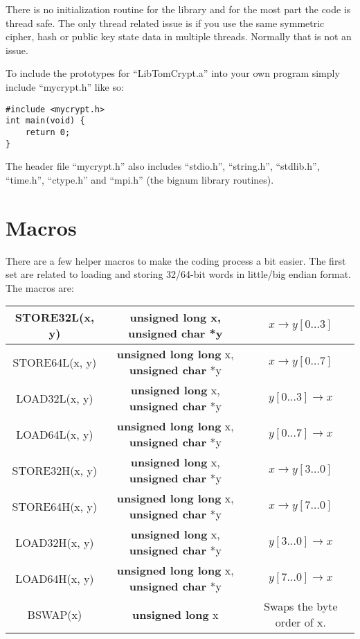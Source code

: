 \documentclass{book}
\begin{document}
There is no initialization routine for the library and for the most part the code is thread safe.  The only thread
related issue is if you use the same symmetric cipher, hash or public key state data in multiple threads.  Normally
that is not an issue.

To include the prototypes for ``LibTomCrypt.a'' into your own program simply include ``mycrypt.h'' like so:
\begin{verbatim}
#include <mycrypt.h>
int main(void) {
    return 0;
}
\end{verbatim}

The header file ``mycrypt.h'' also includes ``stdio.h'', ``string.h'', ``stdlib.h'', ``time.h'', ``ctype.h'' and ``mpi.h''
(the bignum library routines).

\section{Macros}

There are a few helper macros to make the coding process a bit easier.  The first set are related to loading and storing
32/64-bit words in little/big endian format.  The macros are:

   
    
\begin{small}
\begin{center}
\begin{tabular}{|c|c|c|}
     \hline STORE32L(x, y) & {\bf unsigned long} x, {\bf unsigned char} *y & $x \to y[0 \ldots 3]$ \\
     \hline STORE64L(x, y) & {\bf unsigned long long} x, {\bf unsigned char} *y & $x \to y[0 \ldots 7]$ \\
     \hline LOAD32L(x, y) & {\bf unsigned long} x, {\bf unsigned char} *y & $y[0 \ldots 3] \to x$ \\
     \hline LOAD64L(x, y) & {\bf unsigned long long} x, {\bf unsigned char} *y & $y[0 \ldots 7] \to x$ \\
     \hline STORE32H(x, y) & {\bf unsigned long} x, {\bf unsigned char} *y & $x \to y[3 \ldots 0]$ \\
     \hline STORE64H(x, y) & {\bf unsigned long long} x, {\bf unsigned char} *y & $x \to y[7 \ldots 0]$ \\
     \hline LOAD32H(x, y) & {\bf unsigned long} x, {\bf unsigned char} *y & $y[3 \ldots 0] \to x$ \\
     \hline LOAD64H(x, y) & {\bf unsigned long long} x, {\bf unsigned char} *y & $y[7 \ldots 0] \to x$ \\
     \hline BSWAP(x) & {\bf unsigned long} x & Swaps the byte order of x. \\
     \hline
\end{tabular}
\end{center}
\end{small}
\end{document}
